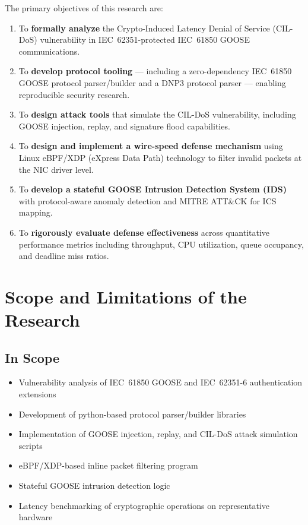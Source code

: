 \documentclass[12pt,a4paper]{article}
\begin{document}
The primary objectives of this research are:

\begin{enumerate}[leftmargin=2cm]
  \item[\textbf{RO1.}] To \textbf{formally analyze} the Crypto-Induced Latency Denial of Service (CIL-DoS) vulnerability in IEC~62351-protected IEC~61850 GOOSE communications.

  \item[\textbf{RO2.}] To \textbf{develop protocol tooling} --- including a zero-dependency IEC~61850 GOOSE protocol parser/builder and a DNP3 protocol parser --- enabling reproducible security research.

  \item[\textbf{RO3.}] To \textbf{design attack tools} that simulate the CIL-DoS vulnerability, including GOOSE injection, replay, and signature flood capabilities.

  \item[\textbf{RO4.}] To \textbf{design and implement a wire-speed defense mechanism} using Linux eBPF/XDP (eXpress Data Path) technology to filter invalid packets at the NIC driver level.

  \item[\textbf{RO5.}] To \textbf{develop a stateful GOOSE Intrusion Detection System (IDS)} with protocol-aware anomaly detection and MITRE ATT\&CK for ICS mapping.

  \item[\textbf{RO6.}] To \textbf{rigorously evaluate defense effectiveness} across quantitative performance metrics including throughput, CPU utilization, queue occupancy, and deadline miss ratios.
\end{enumerate}

\section{Scope and Limitations of the Research}

\subsection{In Scope}

\begin{itemize}[noitemsep]
  \item Vulnerability analysis of IEC~61850 GOOSE and IEC~62351-6 authentication extensions
  \item Development of python-based protocol parser/builder libraries
  \item Implementation of GOOSE injection, replay, and CIL-DoS attack simulation scripts
  \item eBPF/XDP-based inline packet filtering program
  \item Stateful GOOSE intrusion detection logic
  \item Latency benchmarking of cryptographic operations on representative hardware
\end{itemize}
\end{document}

